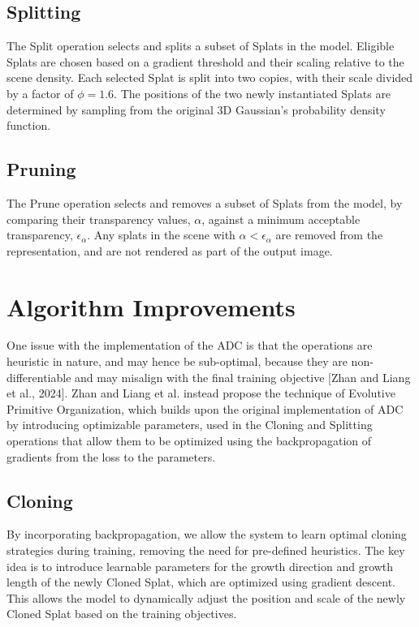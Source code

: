 \documentclass[11pt]{report}
\begin{document}
\subsection{Splitting}
The Split operation selects and splits a subset of Splats in the model. Eligible Splats are chosen based on a gradient threshold and their scaling relative to the scene density. Each selected Splat is split into two copies, with their scale divided by a factor of $\phi = 1.6$. The positions of the two newly instantiated Splats are determined by sampling from the original 3D Gaussian's probability density function.

\subsection{Pruning}
The Prune operation selects and removes a subset of Splats from the model, by comparing their transparency values, $\alpha$, against a minimum acceptable transparency, $\epsilon_{\alpha}$. Any splats in the scene with $\alpha < \epsilon_{\alpha}$ are removed from the representation, and are not rendered as part of the output image.

\section{Algorithm Improvements}
One issue with the implementation of the ADC is that the operations are heuristic in nature, and may hence be sub-optimal, because they are non-differentiable and may misalign with the final training objective [Zhan and Liang et al., 2024]. Zhan and Liang et al. instead propose the technique of Evolutive Primitive Organization, which builds upon the original implementation of ADC by introducing optimizable parameters, used in the Cloning and Splitting operations that allow them to be optimized using the backpropagation of gradients from the loss to the parameters. 

\subsection{Cloning}

By incorporating backpropagation, we allow the system to learn optimal cloning strategies during training, removing the need for pre-defined heuristics. The key idea is to introduce learnable parameters for the growth direction and growth length of the newly Cloned Splat, which are optimized using gradient descent. This allows the model to dynamically adjust the position and scale of the newly Cloned Splat based on the training objectives.
\end{document}
